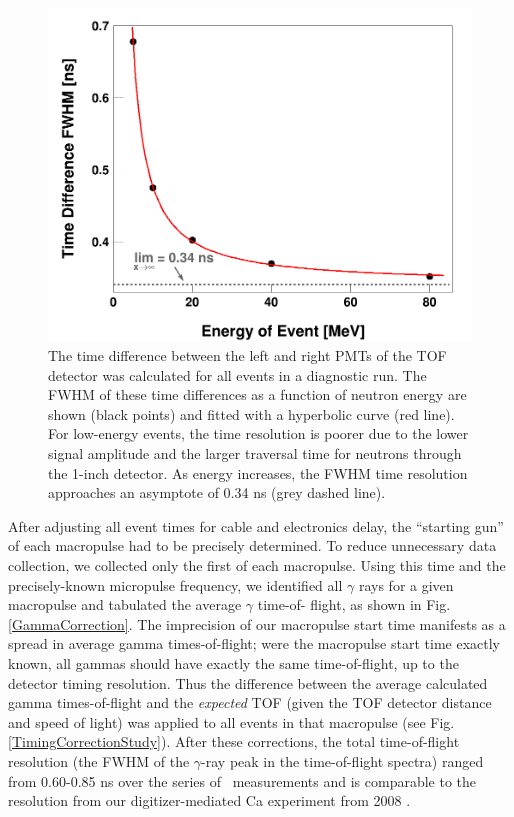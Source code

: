 \begin{figure}
    \includegraphics[scale=0.3]{figures/DifferenceThresholdsFit.png}
    \caption[Intrinsic time resolution of time-of-flight detector as a function
    of signal amplitude]
    {
        The time difference between the left and right PMTs
        of the TOF detector was calculated for all events in a diagnostic run.
        The FWHM of these time differences as a function of
        neutron energy are shown (black points) and fitted with a hyperbolic
        curve (red line). For low-energy
        events, the time resolution is poorer due to the lower signal amplitude and
        the larger traversal time for neutrons through the 1-inch detector. As energy
        increases, the FWHM time resolution approaches an asymptote of 0.34
        ns (grey dashed line).
    }
    \label{DifferenceThresholdsFit}
\end{figure}

After adjusting all event times for cable and electronics delay, the ``starting gun'' of each
macropulse had to be precisely determined. To reduce unnecessary
data collection, we collected only the first \tZero of each macropulse. Using this time and the
precisely-known micropulse frequency, we identified all $\gamma$ rays for a given macropulse and tabulated
the average $\gamma$ time-of- flight, as shown in Fig. \ref{GammaCorrection}. The imprecision of our
macropulse start time manifests as a spread in average gamma times-of-flight; were the macropulse
start time exactly known, all gammas should have exactly the same time-of-flight, up to the detector
timing resolution. Thus the difference between the average calculated gamma times-of-flight and the
\textit{expected} TOF (given the TOF detector distance and speed of light)
was applied to all events in that macropulse (see Fig.
\ref{TimingCorrectionStudy}). After these corrections, the total time-of-flight resolution
(the FWHM of the $\gamma$-ray peak in the time-of-flight spectra) ranged from
0.60-0.85 ns over the series of \tot\ measurements and is comparable to the resolution from 
our digitizer-mediated Ca experiment from 2008 \cite{Shane2010}.

